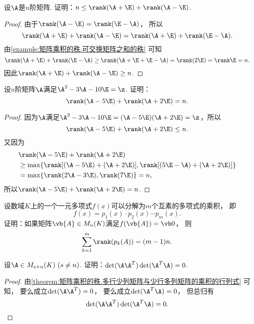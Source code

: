 \begin{example}\label{example:矩阵乘积的秩.矩阵的一次多项式的秩之和}
设\(\A\)是\(n\)阶矩阵.
证明：\(n \leq \rank(\A + \E) + \rank(\A - \E)\).
\begin{proof}
由于\(\rank(\A - \E) = \rank(\E - \A)\)，
所以\[
	\rank(\A + \E) + \rank(\A - \E)
	= \rank(\A + \E) + \rank(\E - \A).
\]
由\cref{example:矩阵乘积的秩.可交换矩阵之和的秩} 可知\[
	\rank(\A + \E) + \rank(\E - \A)
	\geq \rank(\A + \E + \E - \A)
	= \rank(2\E)
	= \rank\E
	= n.
\]
因此\(\rank(\A + \E) + \rank(\A - \E) \geq n\).
\end{proof}
\end{example}
\begin{example}\label{example:矩阵乘积的秩.矩阵的多项式的各个互素因式的秩之和}
设\(n\)阶矩阵\(\A\)满足\(\A^2 - 3 \A - 10 \E = \z\).
证明：\[
	\rank(\A - 5\E) + \rank(\A + 2\E) = n.
\]
\begin{proof}
因为\(\A\)满足\(\A^2 - 3 \A - 10 \E = (\A - 5\E)(\A + 2\E) = \z\)，所以\[
	\rank(\A - 5\E) + \rank(\A + 2\E) \leq n.
\]
又因为\begin{align*}
	&\rank(\A - 5\E) + \rank(\A + 2\E) \\
	&\geq \max\{
		\rank[(\A - 5\E) + (\A + 2\E)],
		\rank[(5\E - \A) + (\A + 2\E)]
		\} \\
	&= \max\{ \rank(2\A - 3\E),\rank(7\E) \}
	= n,
\end{align*}
所以\(\rank(\A - 5\E) + \rank(\A + 2\E) = n\).
\end{proof}
\end{example}
\begin{example}
设数域\(K\)上的一个一元多项式\(f(x)\)可以分解为\(m\)个互素的多项式的乘积，
即\[
	f(x) = p_1(x) \cdot p_2(x) \dotsm p_m(x).
\]
证明：如果矩阵\(\vb{A} \in M_n(K)\)满足\(f(\vb{A}) = \vb0\)，
则\[
	\sum_{k=1}^m \rank(p_k(A))
	= (m-1)n.
\]
\end{example}

\begin{example}
设\(\A \in M_{s \times n}(K)\ (s \neq n)\).
证明：\(\det(\A \A^T) \det(\A^T \A) = 0\).
\begin{proof}
由\cref{theorem:矩阵乘积的秩.多行少列矩阵与少行多列矩阵的乘积的行列式} 可知，
要么成立\(\det(\A \A^T) = 0\)，
要么成立\(\det(\A^T \A) = 0\)，
但总归有\[
	\det(\A \A^T) \det(\A^T \A) = 0.
	\qedhere
\]
\end{proof}
\end{example}


